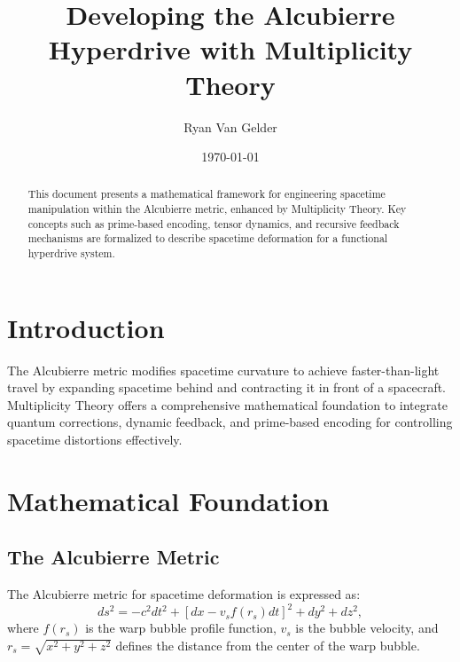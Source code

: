 \documentclass{article}
\theoremstyle{plain}
\begin{document}
\title{Developing the Alcubierre Hyperdrive with Multiplicity Theory}

\author{Ryan Van Gelder}
\date{\today}
\maketitle

\begin{abstract}
This document presents a mathematical framework for engineering spacetime manipulation within the Alcubierre metric, enhanced by Multiplicity Theory. Key concepts such as prime-based encoding, tensor dynamics, and recursive feedback mechanisms are formalized to describe spacetime deformation for a functional hyperdrive system.
\end{abstract}
\section{Introduction}
The Alcubierre metric modifies spacetime curvature to achieve faster-than-light travel by expanding spacetime behind and contracting it in front of a spacecraft. Multiplicity Theory offers a comprehensive mathematical foundation to integrate quantum corrections, dynamic feedback, and prime-based encoding for controlling spacetime distortions effectively.

\section{Mathematical Foundation}

\subsection{The Alcubierre Metric}
The Alcubierre metric for spacetime deformation is expressed as:
\begin{equation}
    ds^2 = -c^2dt^2 + \left[dx - v_s f(r_s)dt\right]^2 + dy^2 + dz^2,
\end{equation}
where $f(r_s)$ is the warp bubble profile function, $v_s$ is the bubble velocity, and $r_s = \sqrt{x^2 + y^2 + z^2}$ defines the distance from the center of the warp bubble.
\end{document}
